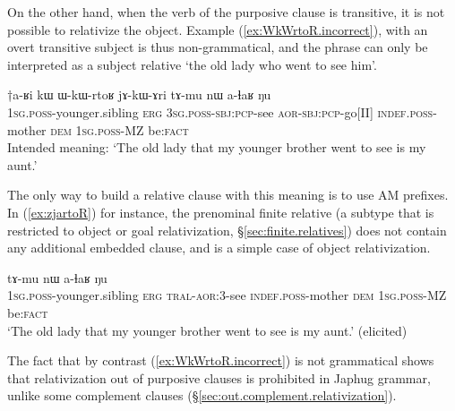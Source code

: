 On the other hand, when the verb of the purposive clause is transitive, it is not possible to relativize the object. Example (\ref{ex:WkWrtoR.incorrect}), with an overt transitive subject  is thus non-grammatical, and the phrase  can only be interpreted as a subject relative `the old lady who went to see him'.

\begin{exe}
\ex  \label{ex:WkWrtoR.incorrect}
\gll †a-ʁi kɯ ɯ-kɯ-rtoʁ jɤ-kɯ-ɤri tɤ-mu nɯ a-ɬaʁ ŋu \\
\textsc{1sg}.\textsc{poss}-younger.sibling \textsc{erg} \textsc{3sg}.\textsc{poss}-\textsc{sbj}:\textsc{pcp}-see \textsc{aor}-\textsc{sbj}:\textsc{pcp}-go[II] \textsc{indef}.\textsc{poss}-mother \textsc{dem}  \textsc{1sg}.\textsc{poss}-MZ be:\textsc{fact}  \\
\glt Intended meaning: `The old lady that my younger brother went to see is my aunt.' 
\end{exe}

The only way to build a relative clause with this meaning is to use AM prefixes. In (\ref{ex:zjartoR}) for instance, the prenominal finite relative (a subtype that is restricted to object or goal relativization, §\ref{sec:finite.relatives})  does not contain any additional embedded clause, and is a simple case of object relativization. 
 

\begin{exe}
\ex  \label{ex:zjartoR}
\gll [a-ʁi kɯ z-ja-rtoʁ] tɤ-mu nɯ a-ɬaʁ ŋu \\
\textsc{1sg}.\textsc{poss}-younger.sibling \textsc{erg} \textsc{tral}-\textsc{aor}:3\flobv{}-see \textsc{indef}.\textsc{poss}-mother \textsc{dem}  \textsc{1sg}.\textsc{poss}-MZ be:\textsc{fact}  \\
\glt  `The old lady that my younger brother went to see is my aunt.' (elicited)
\end{exe}

The fact that by contrast (\ref{ex:WkWrtoR.incorrect}) is not grammatical shows that relativization out of purposive clauses is prohibited in Japhug grammar, unlike some complement clauses (§\ref{sec:out.complement.relativization}).
